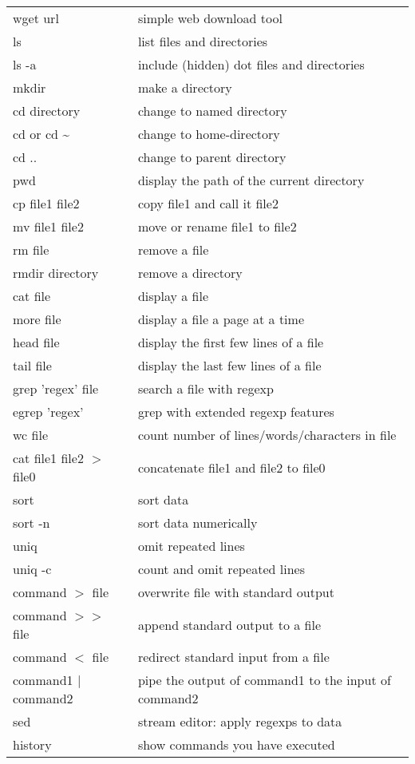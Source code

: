 \documentclass[12pt]{article}
\begin{document}
\begin{tabular}{ll}
wget url & simple web download tool \\
ls &	list files and directories\\
ls -a &	include (hidden) dot files and directories\\
mkdir &	make a directory\\
cd directory & change to named directory\\
cd or cd \~{} & change to home-directory\\
cd .. & change to parent directory\\
pwd & display the path of the current directory\\
cp file1 file2 &	copy file1 and call it file2\\
mv file1 file2 &	move or rename file1 to file2\\
rm file & remove a file\\
rmdir directory & remove a directory\\
cat file & display a file\\
more file & display a file a page at a time\\
head file & display the first few lines of a file \\
tail file & display the last few lines of a file \\
grep 'regex' file & search a file with regexp \\
egrep 'regex'& grep with extended regexp features \\
wc file & count number of lines/words/characters in file \\
cat file1 file2 $>$ file0 & concatenate file1 and file2 to file0\\
sort & sort data \\
sort -n & sort data numerically\\
uniq & omit repeated lines \\
uniq -c & count and omit repeated lines \\
command $>$ file & overwrite file with standard output\\
command $>>$ file & append standard output to a file\\
command $<$ file & redirect standard input from a file\\
command1 $|$ command2 & pipe the output of command1 to the input of command2\\
sed & stream editor: apply regexps to data \\
history & show commands you have executed\\
\end{tabular}
\end{document}
